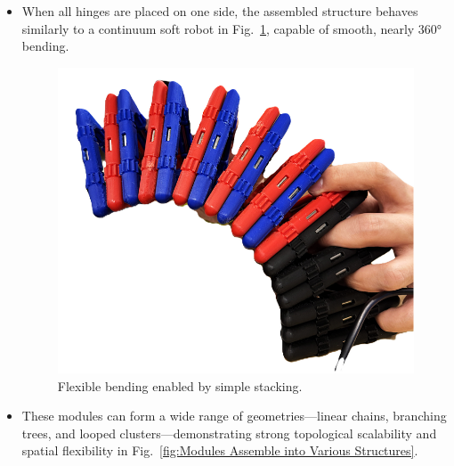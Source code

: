 \documentclass[lettersize,journal]{IEEEtran}
\begin{document}
\begin{itemize}
    \item When all hinges are placed on one side, the assembled structure behaves similarly to a continuum soft robot in Fig.~\ref{fig:Flexible bending enabled by simple stacking}, capable of smooth, nearly 360° bending.

\begin{figure}[H]
    \centering
    \includegraphics[width=0.5\linewidth]{bend 360.png}
    \caption{Flexible bending enabled by simple stacking.}
    \label{fig:Flexible bending enabled by simple stacking}
\end{figure}

    \item These modules can form a wide range of geometries—linear chains, branching trees, and looped clusters—demonstrating strong topological scalability and spatial flexibility in Fig.~\ref{fig:Modules Assemble into Various Structures}.

\begin{figure}[H]
  \centering


\end{figure}
\end{itemize}
\end{document}
